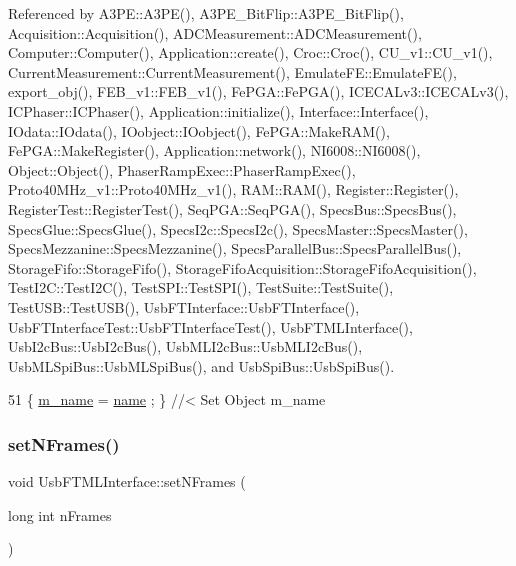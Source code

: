 Referenced by A3\+P\+E\+::\+A3\+P\+E(), A3\+P\+E\+\_\+\+Bit\+Flip\+::\+A3\+P\+E\+\_\+\+Bit\+Flip(), Acquisition\+::\+Acquisition(), A\+D\+C\+Measurement\+::\+A\+D\+C\+Measurement(), Computer\+::\+Computer(), Application\+::create(), Croc\+::\+Croc(), C\+U\+\_\+v1\+::\+C\+U\+\_\+v1(), Current\+Measurement\+::\+Current\+Measurement(), Emulate\+F\+E\+::\+Emulate\+F\+E(), export\+\_\+obj(), F\+E\+B\+\_\+v1\+::\+F\+E\+B\+\_\+v1(), Fe\+P\+G\+A\+::\+Fe\+P\+G\+A(), I\+C\+E\+C\+A\+Lv3\+::\+I\+C\+E\+C\+A\+Lv3(), I\+C\+Phaser\+::\+I\+C\+Phaser(), Application\+::initialize(), Interface\+::\+Interface(), I\+Odata\+::\+I\+Odata(), I\+Oobject\+::\+I\+Oobject(), Fe\+P\+G\+A\+::\+Make\+R\+A\+M(), Fe\+P\+G\+A\+::\+Make\+Register(), Application\+::network(), N\+I6008\+::\+N\+I6008(), Object\+::\+Object(), Phaser\+Ramp\+Exec\+::\+Phaser\+Ramp\+Exec(), Proto40\+M\+Hz\+\_\+v1\+::\+Proto40\+M\+Hz\+\_\+v1(), R\+A\+M\+::\+R\+A\+M(), Register\+::\+Register(), Register\+Test\+::\+Register\+Test(), Seq\+P\+G\+A\+::\+Seq\+P\+G\+A(), Specs\+Bus\+::\+Specs\+Bus(), Specs\+Glue\+::\+Specs\+Glue(), Specs\+I2c\+::\+Specs\+I2c(), Specs\+Master\+::\+Specs\+Master(), Specs\+Mezzanine\+::\+Specs\+Mezzanine(), Specs\+Parallel\+Bus\+::\+Specs\+Parallel\+Bus(), Storage\+Fifo\+::\+Storage\+Fifo(), Storage\+Fifo\+Acquisition\+::\+Storage\+Fifo\+Acquisition(), Test\+I2\+C\+::\+Test\+I2\+C(), Test\+S\+P\+I\+::\+Test\+S\+P\+I(), Test\+Suite\+::\+Test\+Suite(), Test\+U\+S\+B\+::\+Test\+U\+S\+B(), Usb\+F\+T\+Interface\+::\+Usb\+F\+T\+Interface(), Usb\+F\+T\+Interface\+Test\+::\+Usb\+F\+T\+Interface\+Test(), Usb\+F\+T\+M\+L\+Interface(), Usb\+I2c\+Bus\+::\+Usb\+I2c\+Bus(), Usb\+M\+L\+I2c\+Bus\+::\+Usb\+M\+L\+I2c\+Bus(), Usb\+M\+L\+Spi\+Bus\+::\+Usb\+M\+L\+Spi\+Bus(), and Usb\+Spi\+Bus\+::\+Usb\+Spi\+Bus().


\begin{DoxyCode}
51 \{ \hyperlink{classObject_a8b83c95c705d2c3ba0d081fe1710f48d}{m\_name}  = \hyperlink{classObject_a300f4c05dd468c7bb8b3c968868443c1}{name}  ; \} \textcolor{comment}{//< Set Object m\_name}
\end{DoxyCode}
\mbox{\label{classUsbFTMLInterface_a3a0a9d323631790c2db210fdcc85e89b}} 
\subsubsection{\texorpdfstring{set\+N\+Frames()}{setNFrames()}}
{\footnotesize\ttfamily void Usb\+F\+T\+M\+L\+Interface\+::set\+N\+Frames (\begin{DoxyParamCaption}\item[{long int}]{n\+Frames }\end{DoxyParamCaption})\hspace{0.3cm}{\ttfamily [inline]}}

